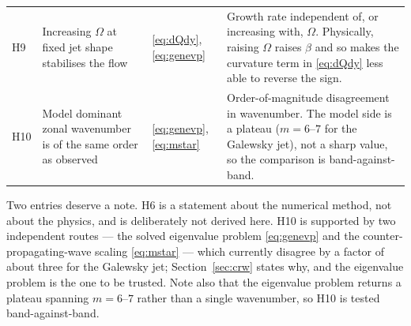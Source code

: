 \documentclass[11pt,a4paper]{article}
\begin{document}
\begin{longtable}{@{}p{}p{}p{}p{}@{}}
H9 & Increasing $\Omega$ at fixed jet shape stabilises the flow
   & \eqref{eq:dQdy}, \eqref{eq:genevp}
   & Growth rate independent of, or increasing with, $\Omega$. Physically,
     raising $\Omega$ raises $\beta$ and so makes the curvature term in
     \eqref{eq:dQdy} less able to reverse the sign. \\
H10 & Model dominant zonal wavenumber is of the same order as observed
   & \eqref{eq:genevp}, \eqref{eq:mstar}
   & Order-of-magnitude disagreement in wavenumber. The model side is a
     plateau ($m = 6$--$7$ for the Galewsky jet), not a sharp value, so the
     comparison is band-against-band. \\
\bottomrule
\end{longtable}

\noindent
Two entries deserve a note. H6 is a statement about the numerical method, not
about the physics, and is deliberately not derived here. H10 is supported by two
independent routes --- the solved eigenvalue problem \eqref{eq:genevp} and the
counter-propagating-wave scaling \eqref{eq:mstar} --- which currently disagree by
a factor of about three for the Galewsky jet; Section~\ref{sec:crw} states why,
and the eigenvalue problem is the one to be trusted. Note also that the
eigenvalue problem returns a plateau spanning $m = 6$--$7$ rather than a single
wavenumber, so H10 is tested band-against-band.
\end{document}
